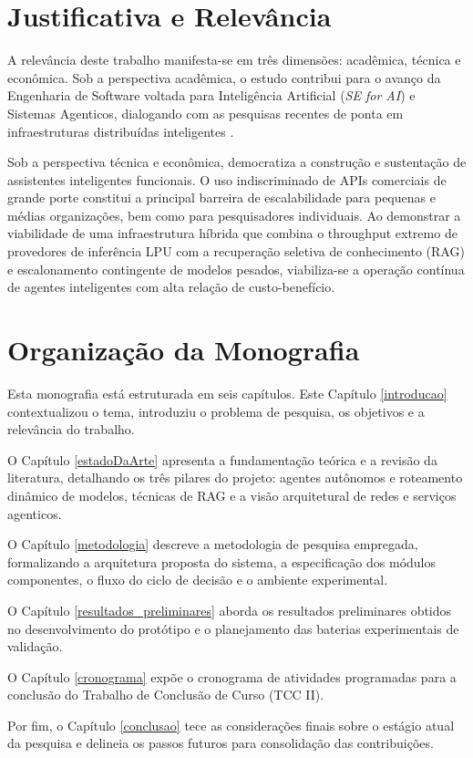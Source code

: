 \section{Justificativa e Relevância}

A relevância deste trabalho manifesta-se em três dimensões: acadêmica, técnica e econômica. Sob a perspectiva acadêmica, o estudo contribui para o avanço da Engenharia de Software voltada para Inteligência Artificial (\textit{SE for AI}) e Sistemas Agenticos, dialogando com as pesquisas recentes de ponta em infraestruturas distribuídas inteligentes \cite{rossi2026adn,lance2026agentasrouter}.

Sob a perspectiva técnica e econômica, democratiza a construção e sustentação de assistentes inteligentes funcionais. O uso indiscriminado de APIs comerciais de grande porte constitui a principal barreira de escalabilidade para pequenas e médias organizações, bem como para pesquisadores individuais. Ao demonstrar a viabilidade de uma infraestrutura híbrida que combina o throughput extremo de provedores de inferência LPU com a recuperação seletiva de conhecimento (RAG) e escalonamento contingente de modelos pesados, viabiliza-se a operação contínua de agentes inteligentes com alta relação de custo-benefício.

\section{Organização da Monografia}

Esta monografia está estruturada em seis capítulos. Este Capítulo \ref{introducao} contextualizou o tema, introduziu o problema de pesquisa, os objetivos e a relevância do trabalho. 

O Capítulo \ref{estadoDaArte} apresenta a fundamentação teórica e a revisão da literatura, detalhando os três pilares do projeto: agentes autônomos e roteamento dinâmico de modelos, técnicas de RAG e a visão arquitetural de redes e serviços agenticos. 

O Capítulo \ref{metodologia} descreve a metodologia de pesquisa empregada, formalizando a arquitetura proposta do sistema, a especificação dos módulos componentes, o fluxo do ciclo de decisão e o ambiente experimental. 

O Capítulo \ref{resultados_preliminares} aborda os resultados preliminares obtidos no desenvolvimento do protótipo e o planejamento das baterias experimentais de validação. 

O Capítulo \ref{cronograma} expõe o cronograma de atividades programadas para a conclusão do Trabalho de Conclusão de Curso (TCC II). 

Por fim, o Capítulo \ref{conclusao} tece as considerações finais sobre o estágio atual da pesquisa e delineia os passos futuros para consolidação das contribuições.
